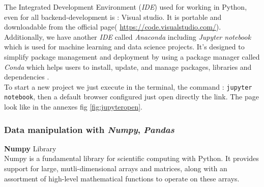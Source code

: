 \documentclass[12pt,a4paper, oneside]{book}
\begin{document}
The Integrated Development Environment (\textit{IDE}) used for working in Python, even for all backend-development is : Visual studio. It is portable and downloadable from the official page( \url{https://code.visualstudio.com/}). Additionally, we have another \textit{IDE} called \textit{Anaconda} including \textit{Jupyter notebook} which is used for machine learning and data science projects. It's designed to simplify package management and deployment by using a package manager called \textit{Conda} which helps users to install, update, and manage packages, libraries and dependencies \citep{teimourzadeh2022application}.\\

To start a new project we just execute in the terminal, the command :  \texttt{jupyter notebook}, then a default browser configured just open directly the link. The page look like in the annexes fig \ref{fig:jupyteropen}.  

\subsubsection{{\large Data manipulation with \textit{Numpy}, \textit{Pandas}}}
  {\textbf{Numpy}} Library\\
 
   Numpy is a fundamental library for scientific computing with Python. It provides support for large, mutli-dimensional arrays and matrices, along with an assortment of high-level mathematical functions to operate on these arrays.\\
   
\end{document}
